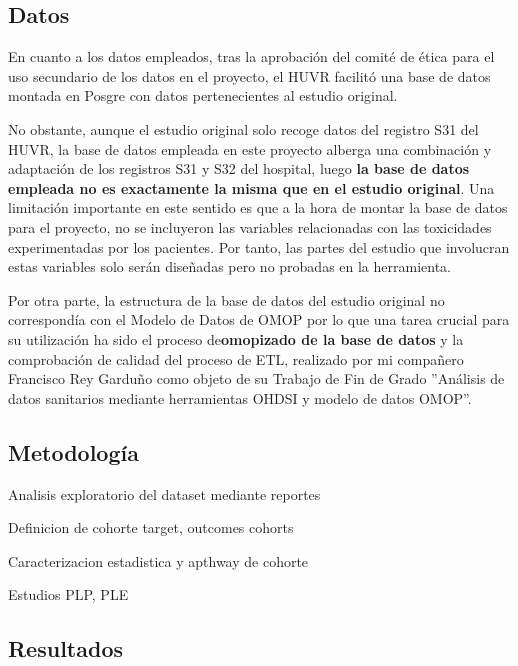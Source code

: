 \subsection{Datos}

En cuanto a los datos empleados, tras la aprobación del comité de ética para el uso secundario de los datos en el proyecto, el HUVR facilitó una base de datos montada en Posgre con datos pertenecientes al estudio original.

No obstante, aunque el estudio original solo recoge datos del registro S31 del HUVR, la base de datos empleada en este proyecto alberga una combinación y adaptación de los registros S31 y S32 del hospital, luego \textbf{la base de datos empleada no es exactamente la misma que en el estudio original}. Una limitación importante en este sentido es que a la hora de montar la base de datos para el proyecto, no se incluyeron las variables relacionadas con las toxicidades experimentadas por los pacientes. Por tanto, las partes del estudio que involucran estas variables solo serán diseñadas pero no probadas en la herramienta.

Por otra parte, la estructura de la base de datos del estudio original no correspondía con el Modelo de Datos de OMOP por lo que una tarea crucial para su utilización ha sido el proceso de\textbf{omopizado de la base de datos} y la comprobación de calidad del proceso de ETL, realizado por mi compañero Francisco Rey Garduño como objeto de su Trabajo de Fin de Grado ''Análisis de datos sanitarios mediante herramientas OHDSI y modelo de datos OMOP''.

\subsection{Metodología}

Analisis exploratorio del dataset mediante reportes

Definicion de cohorte target, outcomes cohorts

Caracterizacion estadistica y apthway de cohorte

Estudios PLP, PLE

\subsection{Resultados}


